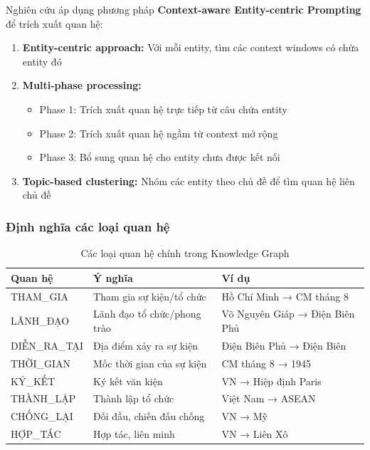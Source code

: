 Nghiên cứu áp dụng phương pháp \textbf{Context-aware Entity-centric Prompting} để trích xuất quan hệ:

\begin{enumerate}
    \item \textbf{Entity-centric approach:} Với mỗi entity, tìm các context windows có chứa entity đó
    
    \item \textbf{Multi-phase processing:}
    \begin{itemize}
        \item Phase 1: Trích xuất quan hệ trực tiếp từ câu chứa entity
        \item Phase 2: Trích xuất quan hệ ngầm từ context mở rộng
        \item Phase 3: Bổ sung quan hệ cho entity chưa được kết nối
    \end{itemize}
    
    \item \textbf{Topic-based clustering:} Nhóm các entity theo chủ đề để tìm quan hệ liên chủ đề
\end{enumerate}

\subsubsection{Định nghĩa các loại quan hệ}

\begin{table}[H]
\centering
\caption{Các loại quan hệ chính trong Knowledge Graph}
\label{tab:relation-types}
\begin{tabular}{|l|l|l|}
\hline
\textbf{Quan hệ} & \textbf{Ý nghĩa} & \textbf{Ví dụ} \\
\hline
THAM\_GIA & Tham gia sự kiện/tổ chức & Hồ Chí Minh → CM tháng 8 \\
LÃNH\_ĐẠO & Lãnh đạo tổ chức/phong trào & Võ Nguyên Giáp → Điện Biên Phủ \\
DIỄN\_RA\_TẠI & Địa điểm xảy ra sự kiện & Điện Biên Phủ → Điện Biên \\
THỜI\_GIAN & Mốc thời gian của sự kiện & CM tháng 8 → 1945 \\
KÝ\_KẾT & Ký kết văn kiện & VN → Hiệp định Paris \\
THÀNH\_LẬP & Thành lập tổ chức & Việt Nam → ASEAN \\
CHỐNG\_LẠI & Đối đầu, chiến đấu chống & VN → Mỹ \\
HỢP\_TÁC & Hợp tác, liên minh & VN → Liên Xô \\
\hline
\end{tabular}
\end{table}

